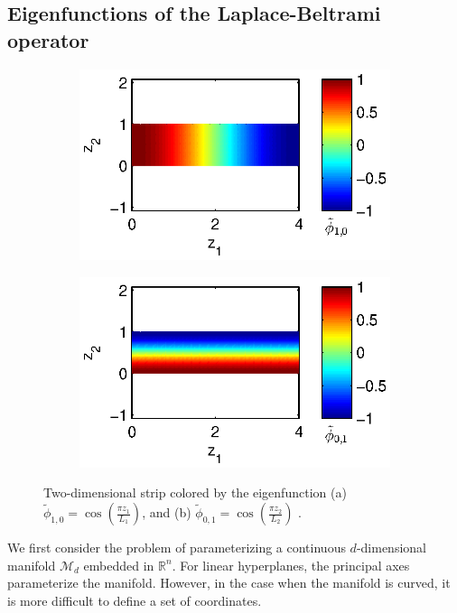 \documentclass[preprint]{elsarticle}
\begin{document}
\subsection{Eigenfunctions of the Laplace-Beltrami operator}

\begin{figure}[t]
\centering
\begin{subfigure}{0.45\textwidth}
\includegraphics[width=\textwidth]{strip_cnts1}
\caption{}
\end{subfigure}
%
\begin{subfigure}{0.45\textwidth}
\includegraphics[width=\textwidth]{strip_cnts2}
\caption{}
\end{subfigure}
\caption{Two-dimensional strip colored by the eigenfunction (a) $\tilde{\phi}_{1, 0} = \cos \left( \frac{\pi z_1}{L_1} \right)$, and (b) $\tilde{\phi}_{0, 1} = \cos \left( \frac{\pi z_2}{L_2} \right)$ .}
\label{fig:strip_efuncs}
\end{figure}

We first consider the problem of parameterizing a continuous $d$-dimensional manifold $\mathcal{M}_d$ embedded in $\mathbb{R}^n$.
%
For linear hyperplanes,  the principal axes parameterize the manifold.
%
However, in the case when the manifold is curved, it is more difficult to define a set of coordinates. 
\end{document}
